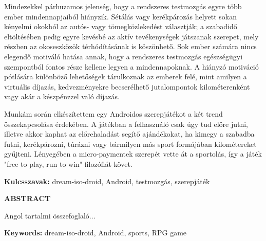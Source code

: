 \documentclass[a4paper,oneside,10pt]{report}
\begin{document}
Mindezekkel párhuzamos jelenség, hogy a rendszeres testmozgás egyre több ember mindennapjaiból hiányzik.
Sétálás vagy kerékpározás helyett sokan kényelmi okokból az autós- vagy tömegközlekedést választják; a szabadidő eltöltésében pedig egyre kevésbé az aktív tevékenységek játszanak szerepet, mely részben az okoseszközök térhódításának is köszönhető.
Sok ember számára nincs elegendő motiváló hatása annak, hogy a rendszeres testmozgás egészségügyi szempontból fontos része kellene legyen a mindennapoknak. 
A hiányzó motiváció pótlására különböző lehetőségek tárulkoznak az emberek felé, mint amilyen a virtuális díjazás, kedvezményekre becserélhető jutalompontok kilométerenként vagy akár a készpénzzel való díjazás. 

Munkám során elkészítettem egy Androidos szerepjátékot a két trend összekapcsolása érdekében. 
A játékban a felhasználó csak úgy tud előre jutni, illetve akkor kaphat az előrehaladást segítő ajándékokat, ha kimegy a szabadba futni, kerékpározni, túrázni vagy bármilyen más sport formájában kilométereket gyűjteni. 
Lényegében a micro-paymentek szerepét vette át a sportolás, így a játék "free to play, run to win" filozófiát követ.


\textbf{Kulcsszavak:} dream-iso-droid, Android, testmozgás, szerepjáték

\newpage

\Large
\begin{center}
	\textbf{ABSTRACT}
\end{center}
\normalsize
\noindent
Angol tartalmi összefoglaló...

\textbf{Keywords:} dream-iso-droid, Android, sports, RPG game
\tableofcontents
\newpage
\listoffigures
\newpage






\pagestyle{plain} %
\end{document}
